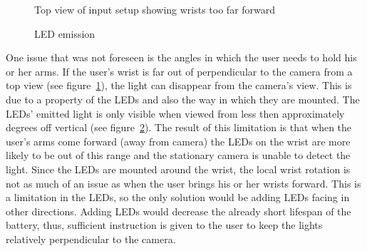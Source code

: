 \documentclass{article}
\begin{document}
\begin{figure}[h!t]
\begin{center}
\end{center}
\caption{Top view of input setup showing wrists too far forward}
\label{fig:wristforward}
\end{figure}

\begin{figure}[h!t]
\begin{center}
\end{center}
\caption{LED emission}
\label{fig:led}
\end{figure}

One issue that was not foreseen is the angles in which the user needs to hold
his or her arms.  If the user's wrist is far out of perpendicular to the camera
from a top view (see figure~\ref{fig:wristforward}), the light can disappear from the camera's
view.  This is due to a property of the LEDs and also the way in which they
are mounted.  The LEDs' emitted light is only visible when viewed from less
then approximately \unit[20]{degrees} off vertical (see figure~\ref{fig:led}).  The result of this
limitation is that when the user's arms come forward (away from camera) the
LEDs on the wrist are more likely to be out of this range and the stationary
camera is unable to detect the light.  Since the LEDs are mounted around the
wrist, the local wrist rotation is not as much of an issue as when the user
brings his or her wrists forward.  This is a limitation in the LEDs, so the
only solution would be adding LEDs facing in other directions.  Adding LEDs
would decrease the already short lifespan of the battery, thus, sufficient
instruction is given to the user to keep the lights relatively perpendicular to
the camera.
\end{document}
